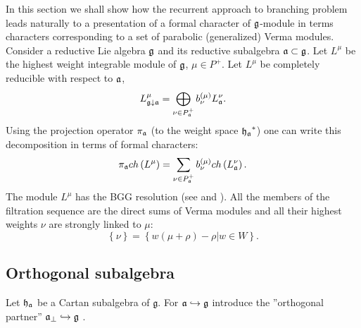 \documentclass[12pt]{article}
\theoremstyle{definition}
\begin{document}
In this section we shall show how the recurrent approach to branching
problem leads naturally to a presentation of a formal character of
$\frak{g}$-module in terms characters corresponding to a set
of parabolic (generalized) Verma modules. Consider a reductive
Lie algebra $\frak{g}$ and its reductive subalgebra $\frak{a}\subset \frak{g}$.
Let $L^{\mu} $ be the highest weight integrable module of $\frak{g}$, $\mu \in
P^{+}$. Let $L^{\mu }$ be completely reducible with respect to $\frak{a}$,
\begin{equation*}
L_{\frak{g}\downarrow \frak{a}}^{\mu }=\bigoplus\limits_{\nu \in P_{\frak{a}%
}^{+}}b_{\nu }^{\left( \mu \right) }L_{\frak{a}}^{\nu }.
\end{equation*}
Using the projection operator $\pi _{\frak{a}}$ (to the weight space $\frak{%
h_{a}}^{\ast }$) one can write this decomposition in terms of formal
characters:
\begin{equation}
\pi _{\frak{a}}ch\left( L^{\mu }\right) =\sum_{\nu \in P_{\frak{a}%
}^{+}}b_{\nu }^{(\mu )}ch\left( L_{\frak{a}}^{\nu }\right) .
\label{branching1}
\end{equation}
The module $L^{\mu }$ has the BGG resolution (see \cite
{bernstein1976category,bernstein1975differential,bernstein1971structure} and
\cite{humphreys2008representations}). All the members of the filtration
sequence are the direct sums of Verma modules and all their highest weights $%
\nu $ are strongly linked to $\mu $:
\begin{equation*}
\left\{ \nu \right\} =\left\{ w\left( \mu +\rho \right) -\rho |w\in
W\right\} .
\end{equation*}

\subsection{Orthogonal subalgebra}

Let $\frak{h}_{\frak{a}}$ be a Cartan subalgebra of $\mathfrak{g}$. For $%
\mathfrak{a}\hookrightarrow \frak{g}$ introduce the ''orthogonal partner'' $%
\mathfrak{a}_{\bot }\hookrightarrow \frak{g}$ .
\end{document}
